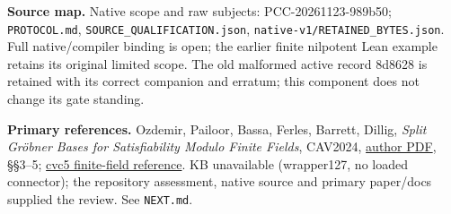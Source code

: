 \documentclass[10pt]{article}
\begin{document}
\textbf{Source map.} Native scope and raw subjects: PCC-20261123-989b50;
\texttt{PROTOCOL.md}, \texttt{SOURCE\_QUALIFICATION.json},
\texttt{native-v1/RETAINED\_BYTES.json}. Full native/compiler binding is open;
the earlier finite nilpotent Lean example retains its original limited scope.
The old malformed active record 8d8628 is retained with its correct companion
and erratum; this component does not change its gate standing.

\textbf{Primary references.} Ozdemir, Pailoor, Bassa, Ferles, Barrett, Dillig,
\emph{Split Gr\"obner Bases for Satisfiability Modulo Finite Fields}, CAV2024,
\href{https://theory.stanford.edu/~barrett/pubs/OPB+24.pdf}{author PDF},
\S\S3--5; \href{https://cvc5.github.io/docs/cvc5-1.4.2/theories/finite_field.html}{cvc5 finite-field reference}.
KB unavailable (wrapper127, no loaded connector); the repository assessment,
native source and primary paper/docs supplied the review. See \texttt{NEXT.md}.
\end{document}

